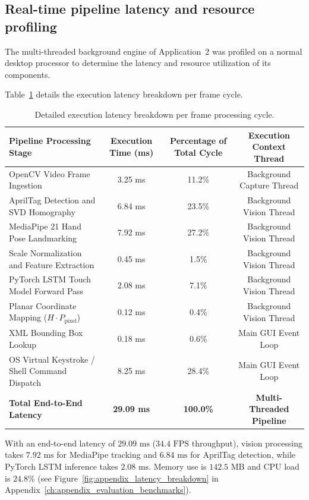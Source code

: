 \subsection{Real-time pipeline latency and resource profiling}
\label{subsec:test_pipeline_profiling}
The multi-threaded background engine of Application~2 was profiled on a normal desktop processor to determine the latency and resource utilization of its components.

Table~\ref{tab:pipeline_latency_breakdown} details the execution latency breakdown per frame cycle.

\begin{table}[htbp]
\centering
\caption{Detailed execution latency breakdown per frame processing cycle.}
\label{tab:pipeline_latency_breakdown}
\begin{tabular}{l c c c}
\toprule
\textbf{Pipeline Processing Stage} & \textbf{Execution Time (ms)} & \textbf{Percentage of Total Cycle} & \textbf{Execution Context Thread} \\
\midrule
OpenCV Video Frame Ingestion & 3.25 ms & 11.2\% & Background Capture Thread \\
AprilTag Detection and SVD Homography & 6.84 ms & 23.5\% & Background Vision Thread \\
MediaPipe 21 Hand Pose Landmarking & 7.92 ms & 27.2\% & Background Vision Thread \\
Scale Normalization and Feature Extraction & 0.45 ms & 1.5\% & Background Vision Thread \\
PyTorch LSTM Touch Model Forward Pass & 2.08 ms & 7.1\% & Background Vision Thread \\
Planar Coordinate Mapping ($H \cdot P_{\text{pixel}}$) & 0.12 ms & 0.4\% & Background Vision Thread \\
XML Bounding Box Lookup & 0.18 ms & 0.6\% & Main GUI Event Loop \\
OS Virtual Keystroke / Shell Command Dispatch & 8.25 ms & 28.4\% & Main GUI Event Loop \\
\midrule
\textbf{Total End-to-End Latency} & \textbf{29.09 ms} & \textbf{100.0\%} & \textbf{Multi-Threaded Pipeline} \\
\bottomrule
\end{tabular}%
\end{table}

With an end-to-end latency of $29.09\text{ ms}$ ($34.4\text{ FPS}$ throughput), vision processing takes $7.92\text{ ms}$ for MediaPipe tracking and $6.84\text{ ms}$ for AprilTag detection, while PyTorch LSTM inference takes $2.08\text{ ms}$. Memory use is $142.5\text{ MB}$ and CPU load is $24.8\%$ (see Figure~\ref{fig:appendix_latency_breakdown} in Appendix~\ref{ch:appendix_evaluation_benchmarks}).

